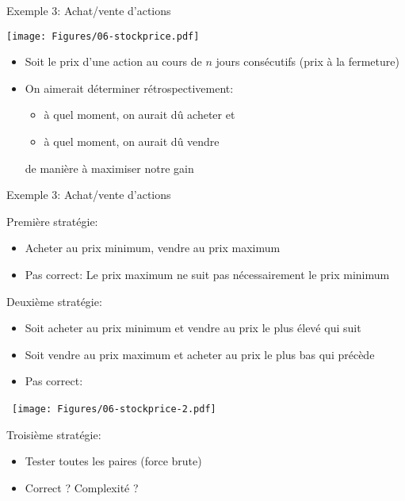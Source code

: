 \begin{frame}{Exemple 3: Achat/vente d'actions}

\centerline{\texttt{[image: Figures/06-stockprice.pdf]}}

\bigskip

\begin{itemize}
\item Soit le prix d'une action au cours de $n$ jours consécutifs (prix à la fermeture)
\item On aimerait déterminer rétrospectivement:
\begin{itemize}
\item à quel moment, on aurait dû acheter et
\item à quel moment, on aurait dû vendre
\end{itemize}
de manière à maximiser notre gain
\end{itemize}

\end{frame}

\begin{frame}{Exemple 3: Achat/vente d'actions}

Première stratégie:
\begin{itemize}
\item Acheter au prix minimum, vendre au prix maximum
\item Pas correct: Le prix maximum ne suit pas nécessairement le prix minimum
\end{itemize}

\bigskip

Deuxième stratégie:
\begin{itemize}
\item Soit acheter au prix minimum et vendre au prix le plus élevé qui suit
\item Soit vendre au prix maximum et acheter au prix le plus bas qui précède
\item Pas correct:
\end{itemize}
\vspace{-0.5cm}
~\hfill\texttt{[image: Figures/06-stockprice-2.pdf]}

\bigskip
\vspace{-0.5cm}
Troisième stratégie:
\begin{itemize}
\item Tester toutes les paires (force brute)
\item Correct ? Complexité ?
\end{itemize}
\end{frame}

